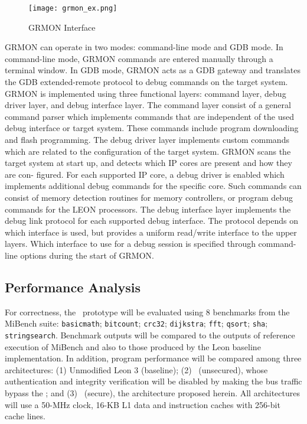  \begin{figure}[ht]
    \centering
    \texttt{[image: grmon\_ex.png]}
    \caption{GRMON  Interface }
    \label{fig:grmon_int}
\end{figure}
GRMON can operate in two modes: command-line mode and GDB mode. In command-line mode, GRMON
commands are entered manually through a terminal window. In GDB mode, GRMON acts as a GDB gateway
and translates the GDB extended-remote protocol to debug commands on the target system.
GRMON is implemented using three functional layers: command layer, debug driver layer, and debug interface
layer. The command layer consist of a general command parser which implements commands that are independent
of the used debug interface or target system. These commands include program downloading and flash
programming.
The debug driver layer implements custom commands which are related to the configuration of the target system. 
GRMON scans the target system at start up, and detects which IP cores are present and how they are con-
figured. For each supported IP core, a debug driver is enabled which implements additional debug commands
for the specific core. Such commands can consist of memory detection routines for memory controllers, or program
debug commands for the LEON processors.
The debug interface layer implements the debug link protocol for each supported debug interface. The protocol
depends on which interface is used, but provides a uniform read/write interface to the upper layers. Which
interface to use for a debug session is specified through command-line options during the start of GRMON.

  \subsection{ Performance Analysis}
  \label{subsec:performance}

  
  For correctness, the  \cshia~prototype will be  evaluated using 8 benchmarks from the MiBench suite: \texttt{basicmath}; \texttt{bitcount}; \texttt{crc32}; \texttt{dijkstra}; \texttt{fft}; \texttt{qsort}; \texttt{sha}; \texttt{stringsearch}. Benchmark outputs will be compared to the outputs of reference execution of MiBench and also to those produced by the Leon baseline implementation. In addition, program performance will be compared among three architectures: (1) Unmodified Leon 3 (baseline); (2) \cshia~(unsecured), whose authentication and integrity verification will be disabled by making the bus traffic bypass the \seccache; and (3) \cshia~(secure), the architecture proposed herein. All architectures will use a 50-MHz clock, 16-KB L1 data and instruction caches with 256-bit cache lines.

